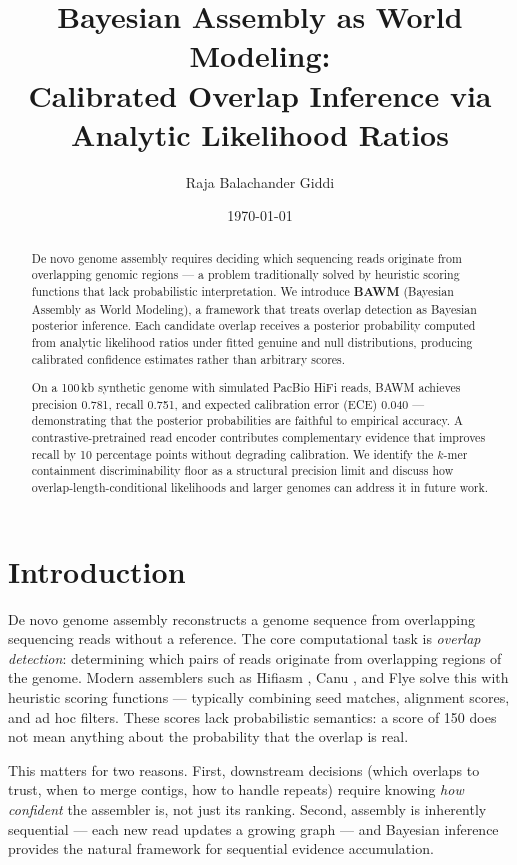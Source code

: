 \documentclass[11pt,a4paper]{article}
\title{Bayesian Assembly as World Modeling:\\
  Calibrated Overlap Inference via Analytic Likelihood Ratios}
\author{Raja Balachander Giddi}
\date{\today}
\begin{document}
\maketitle

\begin{abstract}
De novo genome assembly requires deciding which sequencing reads
originate from overlapping genomic regions --- a problem traditionally
solved by heuristic scoring functions that lack probabilistic
interpretation.  We introduce \textbf{BAWM} (Bayesian Assembly as World
Modeling), a framework that treats overlap detection as Bayesian
posterior inference.  Each candidate overlap receives a posterior
probability computed from analytic likelihood ratios under fitted
genuine and null distributions, producing calibrated confidence
estimates rather than arbitrary scores.

On a 100\,kb synthetic genome with simulated PacBio HiFi reads, BAWM
achieves precision 0.781, recall 0.751, and expected calibration error
(ECE) 0.040 --- demonstrating that the posterior probabilities are
faithful to empirical accuracy.  A contrastive-pretrained read encoder
contributes complementary evidence that improves recall by 10
percentage points without degrading calibration.  We identify the
$k$-mer containment discriminability floor as a structural precision
limit and discuss how overlap-length-conditional likelihoods and larger
genomes can address it in future work.
\end{abstract}

\section{Introduction}
\label{sec:intro}

De novo genome assembly reconstructs a genome sequence from
overlapping sequencing reads without a reference.  The core
computational task is \emph{overlap detection}: determining which
pairs of reads originate from overlapping regions of the genome.
Modern assemblers such as Hifiasm \citep{cheng2021hifiasm}, Canu
\citep{koren2017canu}, and Flye \citep{kolmogorov2019assembly} solve
this with heuristic scoring functions --- typically combining seed
matches, alignment scores, and ad hoc filters.  These scores lack
probabilistic semantics: a score of 150 does not mean anything about
the probability that the overlap is real.

This matters for two reasons.  First, downstream decisions (which
overlaps to trust, when to merge contigs, how to handle repeats)
require knowing \emph{how confident} the assembler is, not just its
ranking.  Second, assembly is inherently sequential --- each new read
updates a growing graph --- and Bayesian inference provides the natural
framework for sequential evidence accumulation.
\end{document}
